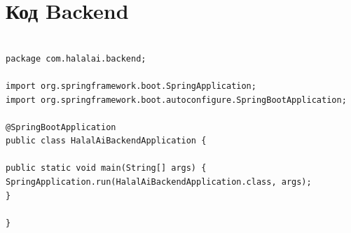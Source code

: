 \chapter{Код Backend}\label{app:backend}
\setcounter{tocdepth}{-1}\setcounter{secnumdepth}{-1}

\begin{lstlisting}[basicstyle=\tiny\ttfamily,breaklines=true]

package com.halalai.backend;

import org.springframework.boot.SpringApplication;
import org.springframework.boot.autoconfigure.SpringBootApplication;

@SpringBootApplication
public class HalalAiBackendApplication {

public static void main(String[] args) {
SpringApplication.run(HalalAiBackendApplication.class, args);
}

}
\end{lstlisting}

